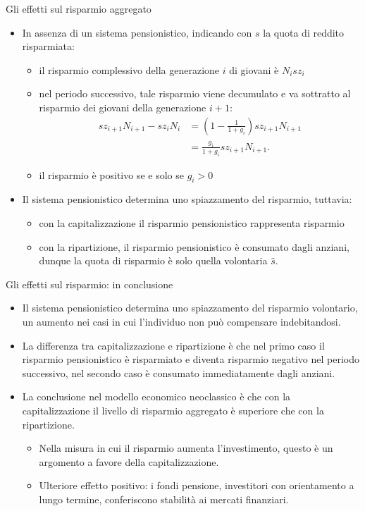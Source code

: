 \documentclass[aspectratio=64,11pt]{beamer}
\begin{document}
\begin{frame}{Gli effetti sul risparmio aggregato}
\begin{itemize}
\item In assenza di un sistema pensionistico, indicando con $s$ la quota di
reddito risparmiata:
\begin{itemize}
\item il risparmio complessivo della generazione $i$ di giovani è $N_isz_i$
\item nel periodo successivo, tale risparmio viene decumulato e va sottratto al
risparmio dei giovani della generazione $i+1$:
\begin{equation*}
\begin{split}
sz_{i+1}N_{i+1}-sz_iN_i&=\left(1-\frac{1}{1+g_i}\right)sz_{i+1}N_{i+1} \\
&= \frac{g_i}{1+g_i}sz_{i+1}N_{i+1}.
\end{split}
\end{equation*}
\item il risparmio è positivo se e solo se $g_i>0$
\end{itemize}
\item Il sistema pensionistico determina uno spiazzamento del risparmio, tuttavia:
\begin{itemize}
\item con la capitalizzazione il risparmio pensionistico rappresenta risparmio
\item con la ripartizione, il risparmio pensionistico è consumato dagli anziani,
dunque la quota di risparmio è solo quella volontaria $\hat s$.
\end{itemize}
\end{itemize}
\end{frame}


\begin{frame}{Gli effetti sul risparmio: in conclusione}
\begin{itemize}
\item Il sistema pensionistico determina uno spiazzamento del risparmio
volontario, un aumento nei casi in cui l'individuo non può compensare
indebitandosi.
\item La differenza tra capitalizzazione e ripartizione è che nel primo caso il
risparmio pensionistico è risparmiato e diventa risparmio negativo nel
periodo successivo, nel secondo caso è consumato immediatamente dagli
anziani.
\item La conclusione nel modello economico neoclassico è che con la
capitalizzazione il livello di risparmio aggregato è superiore che con la
ripartizione.
\begin{itemize}
\item Nella misura in cui il risparmio aumenta l'investimento, questo è un
argomento a favore della capitalizzazione.
\item Ulteriore effetto positivo: i fondi pensione, investitori con orientamento
a lungo termine, conferiscono stabilità ai mercati finanziari.
\end{itemize}
\end{itemize}
\end{frame}
\end{document}
